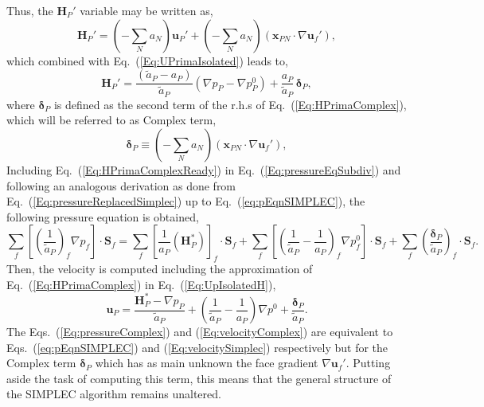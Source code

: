 \documentclass[final,3p,times,11pt,onecolumn]{myElsarticle}
\numberwithin{equation}{section}
\begin{document}
Thus, the $\boldsymbol{H}_P'$ variable may be written as,
\begin{equation}
\label{Eq:HPrimaComplex}
\boldsymbol{H}_P'
=
\left(
-\sum_N a_N
\right)
\boldsymbol{u}_P' 
+
\left(
-\sum_N a_N
\right)
\left(
\boldsymbol{x}_{PN}\cdot 
\nabla \boldsymbol{u}_f'
\right),
\end{equation}
which combined with Eq.~(\ref{Eq:UPrimaIsolated}) leads to,
\begin{equation}
\label{Eq:HPrimaComplexReady}
\boldsymbol{H}_P'
= 
\dfrac
{
\left(
\tilde{a}_P
-
a_P
\right)
}
{
\tilde{a}_P
}
\left(
\nabla p_P
-
\nabla p_P^{0}
\right)
+
\dfrac{a_P}{\tilde{a}_P}
\,
\boldsymbol{\delta}_P,
\end{equation}
where $\boldsymbol{\delta}_P$ is defined as the second term of the r.h.s of Eq.~(\ref{Eq:HPrimaComplex}), which will be referred to as Complex term,
\begin{equation}
\boldsymbol{\delta}_P 
\equiv 
\left(
-\sum_N a_N
\right)
\left(
\boldsymbol{x}_{PN}\cdot 
\nabla \boldsymbol{u}_f'
\right),
\end{equation}
Including Eq.~(\ref{Eq:HPrimaComplexReady}) in Eq.~(\ref{Eq:pressureEqSubdiv}) and following an analogous derivation as done from Eq.~(\ref{Eq:pressureReplacedSimplec}) up to Eq.~(\ref{eq:pEqnSIMPLEC}), the following pressure equation is obtained,
\begin{equation}
\label{Eq:pressureComplex}
\sum_f
\left[
\left(
\dfrac
{1}
{\tilde{a}_P}
\right)_f
\nabla p_f
\right]
\cdot 
\boldsymbol{S}_f
= 
\sum_f 
\left[
\frac{1}{a_P}
\left(
\boldsymbol{H}_P^*
\right)
\right]_f 
\cdot
\boldsymbol{S}_f
+
\sum_f
\left[
\left(
\dfrac
{1}
{\tilde{a}_P}
-
\dfrac
{1}
{a_P}
\right)_f
\nabla p^{0}_f
\right]
\cdot
\boldsymbol{S}_f
+
\sum_f
\left(
\dfrac{\boldsymbol{\delta}_P}{\tilde{a}_P}
\right)_f
\cdot
\boldsymbol{S}_f.
\end{equation}
Then, the velocity is computed including the approximation of Eq.~(\ref{Eq:HPrimaComplex}) in Eq.~(\ref{Eq:UpIsolatedH}),
\begin{equation}
\label{Eq:velocityComplex}
\boldsymbol{u}_P 
=
\dfrac
{
\boldsymbol{H}_P^*
- 
\nabla p_P}
{\tilde{a}_P}
+
\left(
\dfrac{1}
{\tilde{a}_P}
-
\dfrac{1}
{a_P}
\right)
\nabla p^{0}
+
\dfrac{\boldsymbol{\delta}_P}
{\tilde{a}_P}.
\end{equation}
The Eqs.~(\ref{Eq:pressureComplex}) and (\ref{Eq:velocityComplex}) are equivalent to Eqs.~(\ref{eq:pEqnSIMPLEC}) and (\ref{Eq:velocitySimplec}) respectively but for the Complex term $\boldsymbol{\delta}_P$ which has as main unknown the face gradient $\nabla \boldsymbol{u}_f'$. Putting aside the task of computing this term, this means that the general structure of the SIMPLEC algorithm remains unaltered. 
\end{document}
